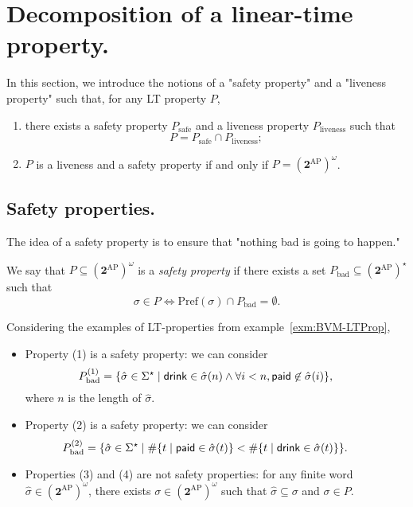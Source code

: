 \documentclass[./main]{subfiles}
\begin{document}
  \section{Decomposition of a linear-time property.}

  In this section, we introduce the notions of a "safety property" and a "liveness property" such that, for any LT property $P$,
  \begin{enumerate}
    \item there exists a safety property $P_\mathrm{safe}$ and a liveness property $P_\mathrm{liveness}$ such that \[
      P = P_\mathrm{safe} \cap P_\mathrm{liveness}
      ;\]
    \item $P$ is a liveness and a safety property if and only if $P = (\mathbf{2}^\mathrm{AP})^\omega$.
  \end{enumerate}

  \subsection{Safety properties.}

  The idea of a safety property is to ensure that "nothing bad is going to happen."

  \begin{defn}
    We say that $P \subseteq (\mathbf{2}^\mathrm{AP})^\omega$ is a \textit{safety property} if there exists a set $P_\mathrm{bad} \subseteq (\mathbf{2}^\mathrm{AP})^\star$ such that
    \[
    \sigma \in P \iff \mathrm{Pref}(\sigma) \cap P_\mathrm{bad} = \emptyset
    .\]
  \end{defn}

  \begin{exm}
    Considering the examples of LT-properties from example~\ref{exm:BVM-LTProp},
    \begin{itemize}
      \item Property (1) is a safety property: we can consider
        \[
          \hspace{-2em}
        P_\mathrm{bad}^{(1)} = \{\hat{\sigma} \in \Sigma^\star \mid \mathsf{drink} \in \hat{\sigma}(n) \land \forall i < n, \mathsf{paid} \not\in \hat{\sigma}(i) \},
        \] 
        where $n$ is the length of $\hat{\sigma}$.
      \item Property (2) is a safety property: we can consider
        \[
          \hspace{-2em}
        P_\mathrm{bad}^{(2)} = \{\hat{\sigma} \in \Sigma^\star \mid \# \{t  \mid \mathsf{paid} \in \hat{\sigma}(t)\} < \# \{t  \mid \mathsf{drink} \in \hat{\sigma}(t)\} \} .
        \]
      \item Properties (3) and (4) are not safety properties: for any finite word $\hat{\sigma} \in (\mathbf{2}^\mathrm{AP})^\omega$, there exists $\sigma \in (\mathbf{2}^\mathrm{AP})^\omega$ such that $\hat{\sigma} \subseteq \sigma$ and $\sigma \in P$.
    \end{itemize}
  \end{exm}
\end{document}
